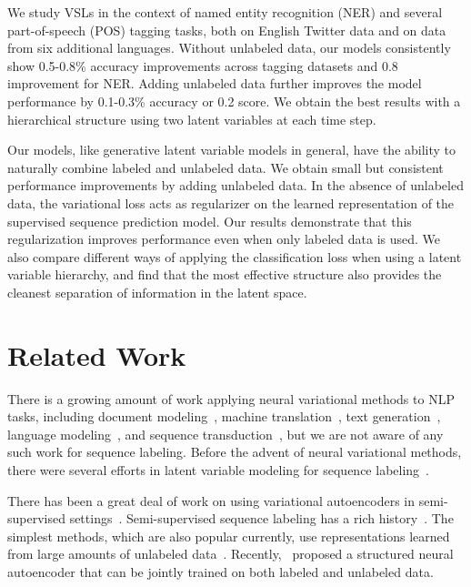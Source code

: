 \documentclass[11pt,a4paper]{article}
\begin{document}
We study VSLs in the context of named entity recognition (NER) and several part-of-speech (POS) tagging tasks, both on English Twitter data and on data from six additional languages.
Without unlabeled data, our models consistently show 0.5-0.8\% accuracy improvements across tagging datasets and 0.8  improvement for NER. Adding unlabeled data further improves the model performance by 0.1-0.3\% accuracy or 0.2  score.
We obtain the best results with a hierarchical structure using two latent variables at each time step.

Our models, like generative latent variable models in general, have the ability to naturally combine labeled and unlabeled data. We obtain small but consistent performance improvements by adding unlabeled data.  In the absence of unlabeled data, the variational loss
acts as regularizer on the learned representation of the supervised sequence prediction model.
Our results demonstrate that this regularization improves performance
even when only labeled data is used.
We also compare different ways of applying the classification loss when using a latent variable hierarchy, and find that the most effective structure also provides the cleanest separation of information in the latent space.

\section{Related Work}

There is a growing amount of work applying neural variational methods to NLP tasks, including document modeling~\cite{mnih2014neural,miao2016neural,serban2017piecewise}, machine translation~\cite{zhang2016variational}, text generation~\cite{bowman2016generating,serban2017piecewise,hu2017toward}, language modeling~\cite{bowman2016generating,yang2017improved}, and sequence transduction~\cite{zhou2017multi}, but we are not aware of any such work for sequence labeling. Before the advent of neural variational methods, there were several efforts in latent variable modeling for sequence labeling~\cite{quattoni2007hidden,SunT09}.

There has been a great deal of work on using variational autoencoders in semi-supervised settings~\cite{kingma2014semi,maaloe2016auxiliary,zhou2017multi,yang2017improved}.
Semi-supervised sequence labeling has a rich history~\cite{altun2006maximum,jiao-EtAl:2006:COLACL,mann-mccallum:2008:ACLMain,subramanya-petrov-pereira:2010:EMNLP,sogaard:2011:ACL-HLT20111}. The simplest methods, which are also popular currently, use representations learned from large amounts of unlabeled data~\cite{miller-guinness-zamanian:2004:HLTNAACL,owoputi-13, peters2017semi}. Recently,~\citet{zhang2017semi} proposed a structured neural autoencoder that can be jointly trained on both labeled and unlabeled data.
\end{document}
